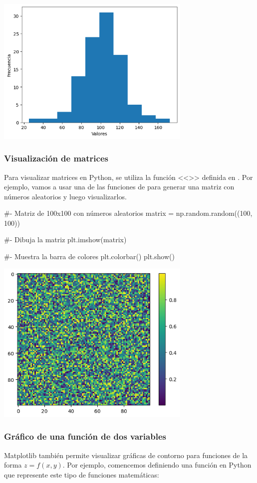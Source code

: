 \noindent
\includegraphics[width=0.7\textwidth]{figures/matplotlib_hist.png}

\subsubsection{Visualización de matrices}
Para visualizar matrices en Python, se utiliza la función <<>> definida en . Por ejemplo, vamos a usar una de las funciones de  para generar una matriz con números aleatorios y luego visualizarlos.

\begin{pyin}[]
#- Matriz de 100x100 con números aleatorios
matrix = np.random.random((100, 100))

#- Dibuja la matriz
plt.imshow(matrix)

#- Muestra la barra de colores
plt.colorbar()
plt.show()
\end{pyin}

\noindent
\includegraphics[width=0.7\textwidth]{figures/matplotlib_matrix.png}

\subsubsection{Gráfico de una función de dos variables}
Matplotlib también permite visualizar gráficas de contorno para funciones de la forma $ z = f(x, y) $. Por ejemplo, comencemos definiendo una función en Python que represente este tipo de funciones matemáticas:

